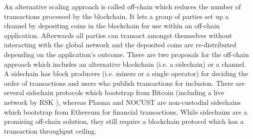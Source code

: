 \documentclass{llncs}
\begin{document}
An alternative scaling approach is called off-chain which reduces the number of transactions processed by the blockchain.
It lets a group of parties set up a channel by depositing coins in the blockchain for use within an off-chain application.
Afterwards all parties can transact amongst themselves without interacting with the global network and the deposited coins are re-distributed depending on the application's outcome. 
There are two proposals for the off-chain approach which includes an alternative blockchain (i.e. a sidechain) or a channel. 
A sidechain has block producers (i.e. miners or a single operator) for deciding the order of transactions and users who publish transactions for inclusion. 
There are several sidechain protocols \cite{back2014enabling,dilley2016strong} which bootstrap from Bitcoin (including a live network by RSK \cite{sidechainrsk}), whereas Plasma\cite{poon2017plasma} and NOCUST\cite{khalilnocust} are non-custodial sidechains which bootstrap from Ethereum for financial transactions.
While sidechains are a promising off-chain solution, they still require a blockchain protocol which has a transaction throughput ceiling.
\end{document}
